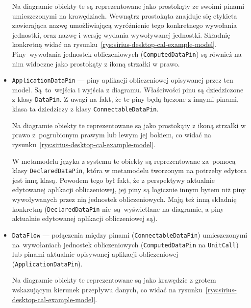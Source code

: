 \begin{itemize}
	      Na diagramie obiekty te są reprezentowane jako prostokąty ze
	      swoimi pinami umieszczonymi na krawędziach. Wewnątrz prostokąta
	      znajduje się
	      etykieta zawierająca nazwę umożliwiającą wyróżnienie tego
	      konkretnego wywołania
	      jednostki, oraz nazwę i wersję wydania wywoływanej jednostki.
	      Składnię
	      konkretną widać na
	      rysunku~\ref{rys:sirius-desktop-cal-example-model}.
	      Piny~wywołania jednostek obliczeniowych
	      (\texttt{ComputedDataPin}) są również
	      na nim widoczne jako prostokąty z ikoną strzałki w prawo.

	\item \texttt{ApplicationDataPin} --- piny aplikacji obliczeniowej
	      opisywanej przez ten model. Są~to~wejścia i wyjścia z diagramu.
	      Właściwości pinu są dziedziczone z klasy \texttt{DataPin}. Z
	      uwagi na fakt, że
	      te piny będą łączone z innymi pinami, klasa ta dziedziczy z klasy
	      \texttt{ConnectableDataPin}.

	      Na diagramie obiekty te reprezentowane są jako prostokąty z ikoną
	      strzałki w prawo z~pogrubionym prawym lub lewym jej bokiem, co
	      widać na
	      rysunku~\ref{rys:sirius-desktop-cal-example-model}.

	      W metamodelu języka \CAL{} z systemu \BalticLSC{} te obiekty są
	      reprezentowane za~pomocą klasy \texttt{DeclaredDataPin}, która w
	      metamodelu
	      tworzonym na potrzeby edytora jest inną klasą. Powodem tego był
	      fakt, że z
	      perspektywy aktualnie edytowanej aplikacji obliczeniowej, jej
	      piny są logicznie
	      innym bytem niż piny wywoływanych przez nią jednostek
	      obliczeniowych. Mają też
	      inną składnię konkretną (\texttt{DeclaredDataPin}
	      nie~są~wyświetlane na
	      diagramie, a piny aktualnie edytowanej aplikacji obliczeniowej
	      są).

	\item \texttt{DataFlow} --- połączenia między pinami
	      (\texttt{ConnectableDataPin}) umieszczonymi na~wywołaniach
	      jednostek obliczeniowych (\texttt{ComputedDataPin} na
	      \texttt{UnitCall}) lub pinami aktualnie opisywanej aplikacji
	      obliczeniowej
	      (\texttt{ApplicationDataPin}).

	      Na diagramie obiekty te reprezentowane są jako krawędzie z grotem
	      wskazującym kierunek przepływu danych, co widać na
	      rysunku~\ref{rys:sirius-desktop-cal-example-model}.
\end{itemize}


